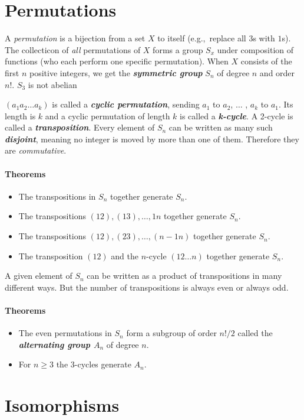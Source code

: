 \documentclass[a4paper,twocolumn,10pt]{article}
\begin{document}
  \section{Permutations}
  A \textit{permutation} is a bijection from a set $X$ to itself (e.g.,~replace
  all $3$s with $1$s).  The collecticon of \textit{all} permutations of
  $X$ forms a group $S_x$ under composition of functions (who each perform one
  specific permutation). When $X$ consists of the first $n$ positive integers,
  we get the \textbf{\textit{symmetric group}} $S_n$ of degree $n$ and order
  $n!$. $S_3$ is not abelian

  $(a_1a_2\ldots a_k)$ is called a \textbf{\textit{cyclic permutation}},
  sending $a_1$ to $a_2$, $\ldots$ , $a_k$ to $a_1$. Its length is $k$ and a
  cyclic permutation of length $k$ is called a \textbf{\textit{k-cycle}}. A
  2-cycle is called a \textbf{\textit{transposition}}. Every element of $S_n$
  can be written as many such \textbf{\textit{disjoint}}, meaning no integer is
  moved by more than one of them. Therefore they are \textit{commutative}.

  \paragraph{Theorems}
  \begin{itemize}
    \item The transpositions in $S_n$ together generate $S_n$.
    \item The transpositions $(12), (13), \ldots, {1n}$ together generate $S_n$.
    \item The transpositions $(12), (23), \ldots, (n-1n)$ together generate $S_n$.
    \item The transposition $(12)$ and the $n$-cycle $(12 \ldots n)$ together
      generate $S_n$.
  \end{itemize}

  A given element of $S_n$ can be written as a product of transpositions in
  many different ways. But the number of transpositions is always even or
  always odd.

  \paragraph{Theorems}
  \begin{itemize}
    \item The even permutations in $S_n$ form a subgroup of order $n!/2$ called
      the \textbf{\textit{alternating group $A_n$}} of degree $n$.
    \item For $n\ge 3$ the 3-cycles generate $A_n$.
  \end{itemize}

  \section{Isomorphisms}
\end{document}
